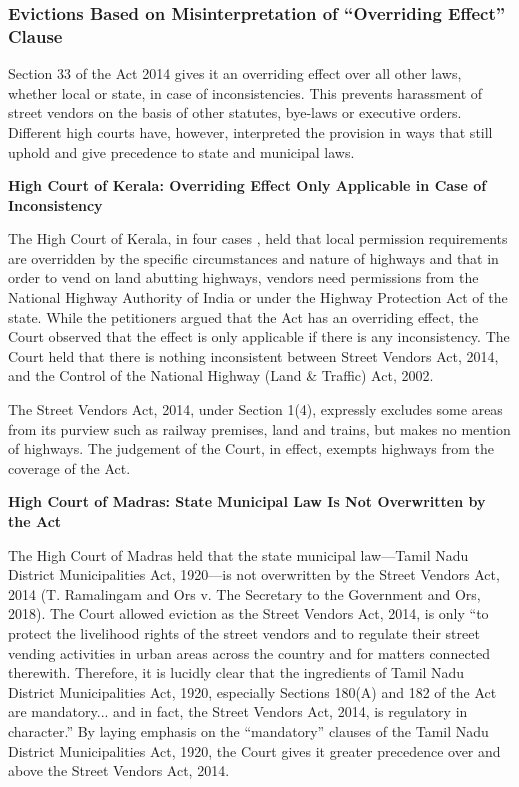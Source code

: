 \documentclass[a4paper, 12pt, twoside]{article}
\begin{document}
\subsubsection{Evictions Based on Misinterpretation of “Overriding Effect” Clause}

Section 33 of the Act 2014 gives it an overriding effect over all other laws, whether local or state, in case of inconsistencies. This prevents harassment of street vendors on the basis of other statutes, bye-laws or executive orders. Different high courts have, however, interpreted the provision in ways that still uphold and give precedence to state and municipal laws.

\textbf{High Court of Kerala: Overriding Effect Only Applicable in Case of Inconsistency}

The High Court of Kerala, in four cases , held that local permission requirements are overridden by the specific circumstances and nature of highways and that in order to vend on land abutting highways, vendors need permissions from the National Highway Authority of India or under the Highway Protection Act of the state. While the petitioners argued that the Act has an overriding effect, the Court observed that the effect is only applicable if there is any inconsistency. The Court held that there is nothing inconsistent between Street Vendors Act, 2014, and the Control of the National Highway (Land \& Traffic) Act, 2002. 

The Street Vendors Act, 2014, under Section 1(4), expressly excludes some areas from its purview such as railway premises, land and trains, but makes no mention of highways. The judgement of the Court, in effect, exempts highways from the coverage of the Act. 

\textbf{High Court of Madras: State Municipal Law Is Not Overwritten by the Act}

The High Court of Madras held that the state municipal law—Tamil Nadu District Municipalities Act, 1920—is not overwritten by the Street Vendors Act, 2014 (T. Ramalingam and Ors v. The Secretary to the Government and Ors, 2018). The Court allowed eviction as the Street Vendors Act, 2014, is only “to protect the livelihood rights of the street vendors and to regulate their street vending activities in urban areas across the country and for matters connected therewith. Therefore, it is lucidly clear that the ingredients of Tamil Nadu District Municipalities Act, 1920, especially Sections 180(A) and 182 of the Act  are mandatory... and in fact, the Street Vendors Act, 2014, is regulatory in character.” By laying emphasis on the “mandatory” clauses of the Tamil Nadu District Municipalities Act, 1920, the Court gives it greater precedence over and above the Street Vendors Act, 2014.
\end{document}
